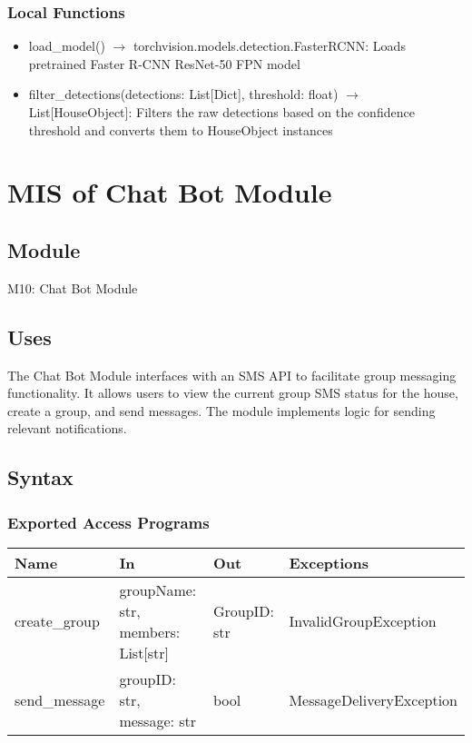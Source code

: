 \documentclass[12pt, titlepage]{article}
\begin{document}
\subsubsection{Local Functions}

\begin{itemize}
  \item load{\_}model() $\rightarrow$ torchvision.models.detection.FasterRCNN: Loads pretrained Faster R-CNN ResNet-50 FPN model
  \item filter{\_}detections(detections: List[Dict], threshold: float) $\rightarrow$ List[HouseObject]: Filters the raw detections based on the confidence threshold and converts them to HouseObject instances
\end{itemize}

\newpage

\section{MIS of Chat Bot Module} \label{Module}

\subsection{Module}

M10: Chat Bot Module

\subsection{Uses}

The Chat Bot Module interfaces with an SMS API to facilitate group messaging functionality. It allows users to view the current group SMS status for the house, create a group, and send messages. The module implements logic for sending relevant notifications.

\subsection{Syntax}

\subsubsection{Exported Access Programs}

\begin{center}
\begin{tabular}{p{3cm} p{5cm} p{3cm} p{5cm}}
\hline
\textbf{Name} & \textbf{In} & \textbf{Out} & \textbf{Exceptions} \\
\hline
create{\_}group & groupName: str, members: List[str] & GroupID: str & InvalidGroupException \\
\hline
send{\_}message & groupID: str, message: str & bool & MessageDeliveryException \\
\hline
\end{tabular}
\end{center}
\end{document}
